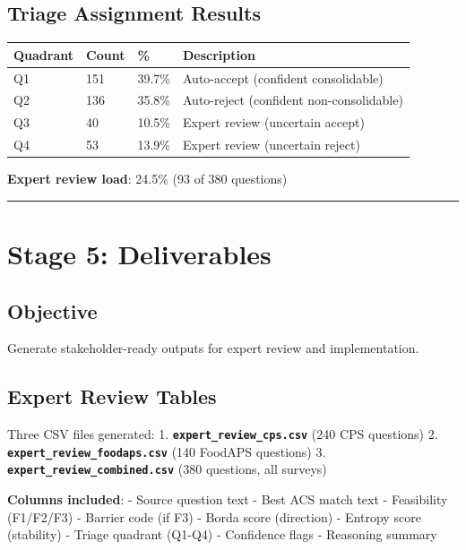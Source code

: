\documentclass[
  letterpaper,
]{report}
\begin{document}
\subsection{Triage Assignment Results}\label{triage-assignment-results}

\begin{longtable}[]{@{}llll@{}}
\toprule\noalign{}
Quadrant & Count & \% & Description \\
\midrule\noalign{}
\endhead
\bottomrule\noalign{}
\endlastfoot
Q1 & 151 & 39.7\% & Auto-accept (confident consolidable) \\
Q2 & 136 & 35.8\% & Auto-reject (confident non-consolidable) \\
Q3 & 40 & 10.5\% & Expert review (uncertain accept) \\
Q4 & 53 & 13.9\% & Expert review (uncertain reject) \\
\end{longtable}

\textbf{Expert review load}: 24.5\% (93 of 380 questions)

\begin{center}\rule{0.5\linewidth}{0.5pt}\end{center}

\section{Stage 5: Deliverables}\label{stage-5-deliverables}

\subsection{Objective}\label{objective-4}

Generate stakeholder-ready outputs for expert review and implementation.

\subsection{Expert Review Tables}\label{expert-review-tables}

Three CSV files generated: 1. \textbf{\texttt{expert\_review\_cps.csv}}
(240 CPS questions) 2. \textbf{\texttt{expert\_review\_foodaps.csv}}
(140 FoodAPS questions) 3.
\textbf{\texttt{expert\_review\_combined.csv}} (380 questions, all
surveys)

\textbf{Columns included}: - Source question text - Best ACS match text
- Feasibility (F1/F2/F3) - Barrier code (if F3) - Borda score
(direction) - Entropy score (stability) - Triage quadrant (Q1-Q4) -
Confidence flags - Reasoning summary
\end{document}
